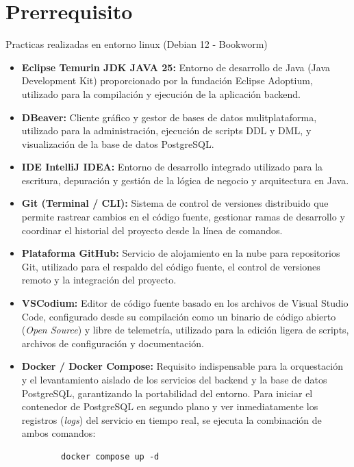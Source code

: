 \section{Prerrequisito}

Practicas realizadas en entorno linux (Debian 12 - Bookworm)


\begin{itemize}
    
   \item \textbf{Eclipse Temurin JDK JAVA 25:} Entorno de desarrollo de Java (Java Development Kit) proporcionado por la fundación Eclipse Adoptium, utilizado para la compilación y ejecución de la aplicación backend.
    
   \item \textbf{DBeaver:} Cliente gráfico y gestor de bases de datos mulitplataforma, utilizado para la administración, ejecución de scripts DDL y DML, y visualización de la base de datos PostgreSQL.
   
   \item \textbf{IDE IntelliJ IDEA:} Entorno de desarrollo integrado utilizado para la escritura, depuración y gestión de la lógica de negocio y arquitectura en Java.
   
   \item \textbf{Git (Terminal / CLI):} Sistema de control de versiones distribuido que permite rastrear cambios en el código fuente, gestionar ramas de desarrollo y coordinar el historial del proyecto desde la línea de comandos.

   \item \textbf{Plataforma GitHub:} Servicio de alojamiento en la nube para repositorios Git, utilizado para el respaldo del código fuente, el control de versiones remoto y la integración del proyecto.
    
   \item \textbf{VSCodium:} Editor de código fuente basado en los archivos de Visual Studio Code, configurado desde su compilación como un binario de código abierto (\textit{Open Source}) y libre de telemetría, utilizado para la edición ligera de scripts, archivos de configuración y documentación.
   
   \item \textbf{Docker / Docker Compose:} Requisito indispensable para la orquestación y el levantamiento aislado de los servicios del backend y la base de datos PostgreSQL, garantizando la portabilidad del entorno.
    Para iniciar el contenedor de PostgreSQL en segundo plano y ver inmediatamente los registros (\textit{logs}) del servicio en tiempo real, se ejecuta la combinación de ambos comandos:
    \begin{verbatim}
        docker compose up -d
    \end{verbatim}
\end{itemize}


